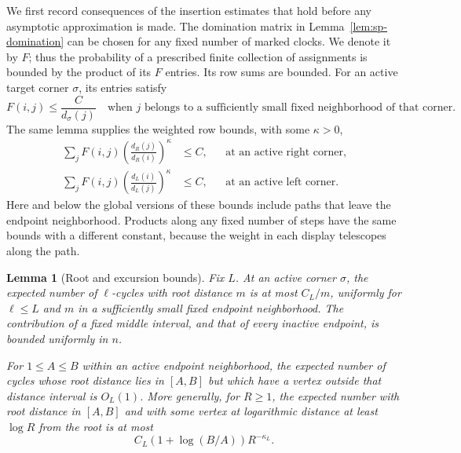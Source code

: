 \documentclass[11pt]{article}
\newtheorem{lemma}[theorem]{Lemma}
\theoremstyle{remark}
\theoremstyle{plain}
\begin{document}
We first record consequences of the insertion estimates that hold before
any asymptotic approximation is made.  The domination matrix in
Lemma~\ref{lem:sp-domination} can be chosen for any fixed number of marked
clocks.  We denote it by $F$; thus the probability of a prescribed finite
collection of assignments is bounded by the product of its $F$ entries.
Its row sums are bounded.  For an active target corner $\sigma$, its
entries satisfy
\begin{equation}\label{eq:sp-F-target}
 F(i,j)\le \frac{C}{d_\sigma(j)}
 \quad\text{when }j\text{ belongs to a sufficiently small fixed
 neighborhood of that corner}.
\end{equation}
The same lemma supplies the weighted row bounds, with some $\kappa>0$,
\begin{align}
 \sum_jF(i,j)\left(\frac{d_R(j)}{d_R(i)}\right)^\kappa&\le C,
 &&\text{at an active right corner},\label{eq:sp-row-right}\\
 \sum_jF(i,j)\left(\frac{d_L(i)}{d_L(j)}\right)^\kappa&\le C,
 &&\text{at an active left corner}.\label{eq:sp-row-left}
\end{align}
Here and below the global versions of these bounds include paths that
leave the endpoint neighborhood.  Products along any fixed number of
steps have the same bounds with a different constant, because the weight
in each display telescopes along the path.

\begin{lemma}[Root and excursion bounds]\label{lem:sp-root-excursion}
Fix $L$.  At an active corner $\sigma$, the expected number of
$\ell$-cycles with root distance $m$ is at most $C_L/m$, uniformly for
$\ell\le L$ and $m$ in a sufficiently small fixed endpoint neighborhood.
The contribution of a fixed middle interval, and that of every inactive
endpoint, is bounded uniformly in $n$.

For $1\le A\le B$ within an active endpoint neighborhood, the expected
number of cycles whose root distance lies in $[A,B]$ but which have a
vertex outside that distance interval is $O_L(1)$.  More generally, for
$R\ge1$, the expected number with root distance in $[A,B]$ and with some
vertex at logarithmic distance at least $\log R$ from the root is at most
\begin{equation}\label{eq:sp-log-excursion}
 C_L(1+\log(B/A))R^{-\kappa_L}.
\end{equation}
\end{lemma}
\end{document}
